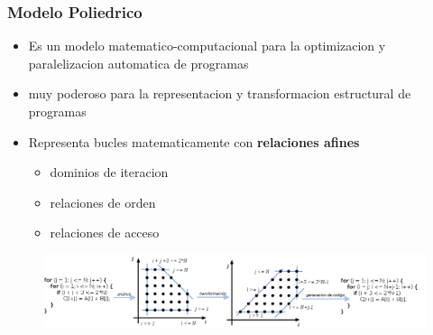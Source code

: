 \documentclass{beamer}\usetheme{Madrid} %
\begin{document}
\begin{frame} 
\frametitle{Modelo Poliedrico}
	\begin{itemize} 
	\item Es un modelo matematico-computacional para la optimizacion y 
			paralelizacion automatica de programas
	\item muy poderoso para la representacion y transformacion estructural de programas
	\item Representa bucles matematicamente con \textbf{relaciones afines}
		\begin{itemize}
		\item dominios de iteracion
		\item relaciones de orden
		\item relaciones de acceso
		\end{itemize}
	\end{itemize}
		\begin{figure}
			\includegraphics[scale=0.30]{img/poly_pipeline2.png}
		\end{figure}
\end{frame}
\end{document}
